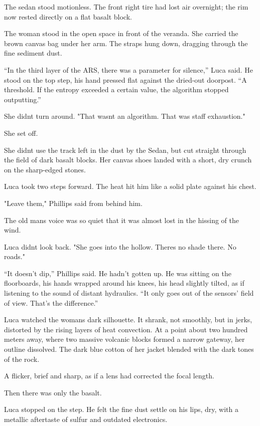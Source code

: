 \documentclass[
  ngerman,
]{article}
\begin{document}
The sedan stood motionless. The front right tire had lost air overnight;
the rim now rested directly on a flat basalt block.

The woman stood in the open space in front of the veranda. She carried
the brown canvas bag under her arm. The straps hung down, dragging
through the fine sediment dust.

``In the third layer of the ARS, there was a parameter for silence,''
Luca said. He stood on the top step, his hand pressed flat against the
dried-out doorpost. ``A threshold. If the entropy exceeded a certain
value, the algorithm stopped outputting.''

She didn\textquotesingle t turn around. "That wasn\textquotesingle t an
algorithm. That was staff exhaustion."

She set off.

She didn\textquotesingle t use the track left in the dust by the Sedan,
but cut straight through the field of dark basalt blocks. Her canvas
shoes landed with a short, dry crunch on the sharp-edged stones.

Luca took two steps forward. The heat hit him like a solid plate against
his chest.

"Leave them," Phillips said from behind him.

The old man\textquotesingle s voice was so quiet that it was almost lost
in the hissing of the wind.

Luca didn\textquotesingle t look back. "She goes into the hollow.
There\textquotesingle s no shade there. No roads."

``It doesn't dip,'' Phillips said. He hadn't gotten up. He was sitting
on the floorboards, his hands wrapped around his knees, his head
slightly tilted, as if listening to the sound of distant hydraulics.
``It only goes out of the sensors' field of view. That's the
difference.''

Luca watched the woman\textquotesingle s dark silhouette. It shrank, not
smoothly, but in jerks, distorted by the rising layers of heat
convection. At a point about two hundred meters away, where two massive
volcanic blocks formed a narrow gateway, her outline dissolved. The dark
blue cotton of her jacket blended with the dark tones of the rock.

A flicker, brief and sharp, as if a lens had corrected the focal length.

Then there was only the basalt.

Luca stopped on the step. He felt the fine dust settle on his lips, dry,
with a metallic aftertaste of sulfur and outdated electronics.
\end{document}
